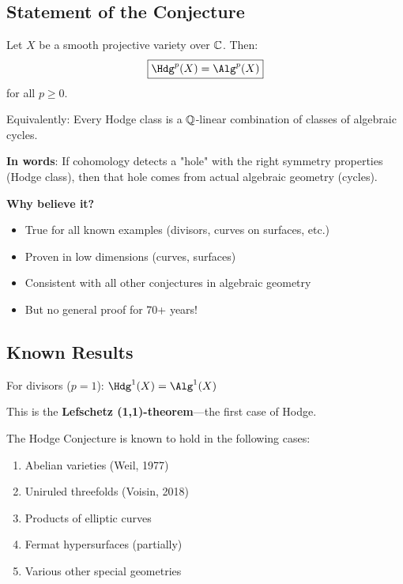 \subsection{Statement of the Conjecture}

\begin{conjecture}\label{conj:hodge}
Let $X$ be a smooth projective variety over $\mathbb{C}$. Then:
\begin{equation}
\boxed{\Hdg^p(X) = \Alg^p(X)}
\end{equation}
for all $p \geq 0$.

Equivalently: Every Hodge class is a $\mathbb{Q}$-linear combination of classes of algebraic cycles.
\end{conjecture}

\begin{intuitive}
\textbf{In words}: If cohomology detects a "hole" with the right symmetry properties (Hodge class), then that hole comes from actual algebraic geometry (cycles).

\textbf{Why believe it?}
\begin{itemize}
\item True for all known examples (divisors, curves on surfaces, etc.)
\item Proven in low dimensions (curves, surfaces)
\item Consistent with all other conjectures in algebraic geometry
\item But no general proof for 70+ years!
\end{itemize}
\end{intuitive}

\subsection{Known Results}

\begin{theorem}[Lefschetz (1924)]\label{thm:lefschetz}
For divisors ($p = 1$): $\Hdg^1(X) = \Alg^1(X)$

This is the \textbf{Lefschetz (1,1)-theorem}—the first case of Hodge.
\end{theorem}

\begin{theorem}\label{thm:known-cases}
The Hodge Conjecture is known to hold in the following cases:
\begin{enumerate}
\item Abelian varieties (Weil, 1977)
\item Uniruled threefolds (Voisin, 2018)
\item Products of elliptic curves
\item Fermat hypersurfaces (partially)
\item Various other special geometries
\end{enumerate}
\end{theorem}

